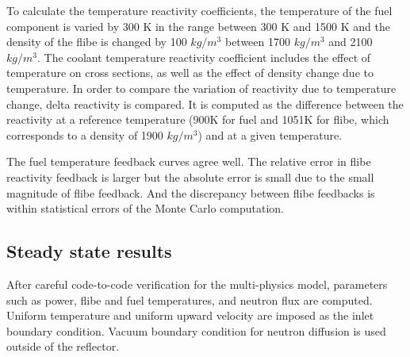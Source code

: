 \documentclass{elsarticle}
\begin{document}
To calculate the temperature reactivity coefficients, the temperature of the fuel component is varied by 300 K in the range between 300 K and 1500 K and the density of the flibe is changed by 100 $kg/m^3$ between 1700 $kg/m^3$ and 2100 $kg/m^3$. The coolant temperature reactivity coefficient includes the effect of temperature on cross sections, as well as the effect of density change due to temperature. 
In order to compare the variation of reactivity due to temperature change, delta reactivity is compared. It is computed as the difference between the reactivity at a reference temperature (900K for fuel and 1051K for flibe, which corresponds to a density of 1900 $kg/m^3$) and at a given temperature. 


The fuel temperature feedback curves agree well. 
The relative error in flibe reactivity feedback is larger but the absolute error is small due to the small magnitude of flibe feedback. And the discrepancy between flibe feedbacks is within statistical errors of the Monte Carlo computation. 


\subsection{Steady state results}
After careful code-to-code verification for the multi-physics model, parameters such as power, flibe and fuel temperatures, and neutron flux are computed. Uniform temperature and uniform upward velocity are imposed as the inlet boundary condition. Vacuum boundary condition for neutron diffusion is used outside of the reflector.  
\end{document}
